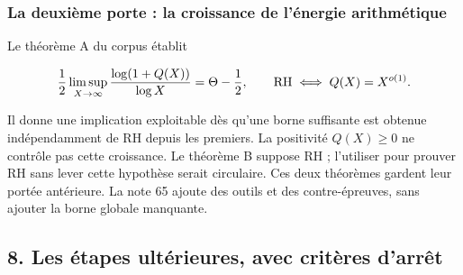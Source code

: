 \documentclass[
  10pt,
  a4paper,
]{article}
\begin{document}
\hypertarget{la-deuxiuxe8me-porte-la-croissance-de-luxe9nergie-arithmuxe9tique}{%
\subsubsection{La deuxième porte : la croissance de l'énergie
arithmétique}\label{la-deuxiuxe8me-porte-la-croissance-de-luxe9nergie-arithmuxe9tique}}

Le théorème A du corpus établit

\[
{1\over2}\limsup_{X\to\infty}{\log(1+Q(X))\over\log X}
=\Theta-{1\over2},\qquad
\mathrm{RH}\iff Q(X)=X^{o(1)}.
\]

Il donne une implication exploitable dès qu'une borne suffisante est
obtenue indépendamment de RH depuis les premiers. La positivité
\(Q(X)\ge0\) ne contrôle pas cette croissance. Le théorème B suppose RH
; l'utiliser pour prouver RH sans lever cette hypothèse serait
circulaire. Ces deux théorèmes gardent leur portée antérieure. La note
65 ajoute des outils et des contre-épreuves, sans ajouter la borne
globale manquante.

\newpage

\hypertarget{les-uxe9tapes-ultuxe9rieures-avec-crituxe8res-darruxeat}{%
\subsection{8. Les étapes ultérieures, avec critères
d'arrêt}\label{les-uxe9tapes-ultuxe9rieures-avec-crituxe8res-darruxeat}}
\end{document}
